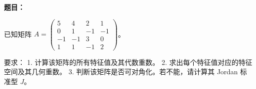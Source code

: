 \textbf{题目：}

已知矩阵 $A = \begin{pmatrix} 5 & 4 & 2 & 1 \\ 0 & 1 & -1 & -1 \\ -1 & -1 & 3 & 0 \\ 1 & 1 & -1 & 2 \end{pmatrix}$。

要求：
1. 计算该矩阵的所有特征值及其代数重数。
2. 求出每个特征值对应的特征空间及其几何重数。
3. 判断该矩阵是否可对角化。若不能，请计算其 Jordan 标准型 $J$。
